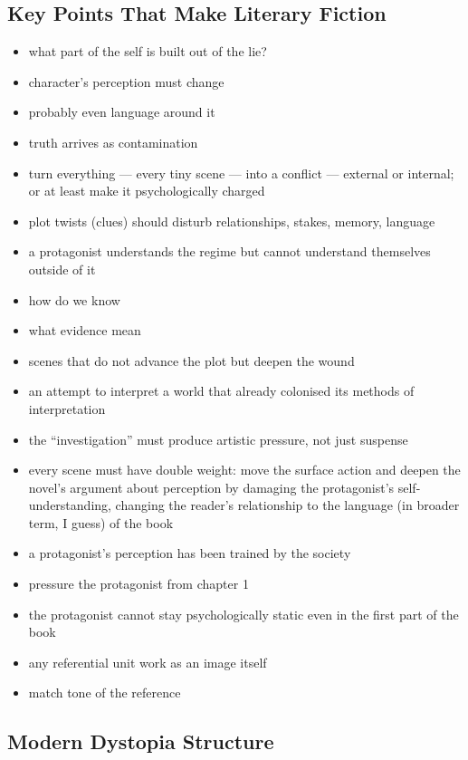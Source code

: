 \documentclass[12pt]{article}
\begin{document}
\subsection{Key Points That Make Literary Fiction}

\begin{itemize}
  \item what part of the self is built out of the lie?
  \item character’s perception must change
  \item probably even language around it
  \item truth arrives as contamination
  \item turn everything — every tiny scene — into a conflict — external or internal; or at least make it psychologically charged
  \item plot twists (clues) should disturb relationships, stakes, memory, language
  \item a protagonist understands the regime but cannot understand themselves outside of it
  \item how do we know
  \item what evidence mean
  \item scenes that do not advance the plot but deepen the wound
  \item an attempt to interpret a world that already colonised its methods of interpretation
  \item the “investigation” must produce artistic pressure, not just suspense
  \item every scene must have double weight: move the surface action and deepen the novel’s argument about perception by damaging the protagonist’s self-understanding, changing the reader’s relationship to the language (in broader term, I guess) of the book
  \item a protagonist’s perception has been trained by the society
  \item pressure the protagonist from chapter 1
  \item the protagonist cannot stay psychologically static even in the first part of the book
  \item any referential unit work as an image itself
  \item match tone of the reference
\end{itemize}

\subsection{Modern Dystopia Structure}
\end{document}
